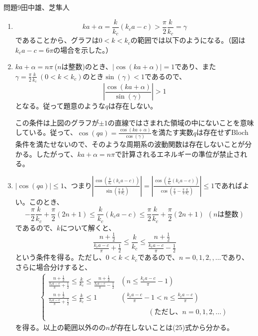 \documentclass[fleqn]{jbook}
\begin{document}
\begin{answer}{問題9}{田中雄、芝隼人}
\begin{enumerate}
\item
\begin{equation}
ka+\alpha = \frac{k}{k_{c}}(k_{c}a-c) > \frac{\pi}{2}\frac{k}{k_{c}} = \gamma
\end{equation}
であることから、グラフは$0<k<k_{c}$の範囲では以下のようになる。（図は$k_ca-c=6\pi$の場合を示した。）
\begin{center}

\end{center}
\item
$ka+\alpha=n\pi \ $($n$は整数)のとき、$|\cos (ka+\alpha )|=1$であり、また$\gamma =\frac{\pi}{2}\frac{k}{k_{c}}\ (0<k<k_{c})$のとき$\sin (\gamma)<1$であるので、
\begin{equation}
\left|\frac{\cos (ka+\alpha )}{\sin (\gamma)}\right|>1
\end{equation}
となる。従って題意のような$q$は存在しない。

この条件は上図のグラフが$\pm 1$の直線ではさまれた領域の中にないことを意味している。従って、$\cos (qa)=\frac{\cos (ka+\alpha )}{\cos (\gamma)}$を満たす実数$q$は存在せずBloch条件を満たせないので、そのような周期系の波動関数は存在しないことが分かる。したがって、$ka+\alpha=n\pi $で計算されるエネルギーの準位が禁止される。\\

\item
$|\cos (qa)|\le 1$、つまり$\displaystyle\left|\frac{\cos (\frac{k}{k_{c}}(k_{c}a-c))}{\sin (\frac{\pi}{2}\frac{k}{k_{c}})}\right|=\left|\frac{\cos (\frac{k}{k_{c}}(k_{c}a-c))}{\cos (\frac{\pi}{2}-\frac{\pi}{2}\frac{k}{k_{c}})}\right|\le 1$であればよい。このとき、
\begin{equation}
-\frac{\pi}{2}\frac{k}{k_{c}}+\frac{\pi}{2}(2n+1) \le \frac{k}{k_{c}}(k_{c}a-c) \le \frac{\pi}{2}\frac{k}{k_{c}}+\frac{\pi}{2}(2n+1) \ \ (nは整数)
\end{equation}
であるので、$k$について解くと、
\begin{equation}
\displaystyle\frac{n+\frac{1}{2}}{\frac{k_{c}a-c}{\pi}+ \frac{1}{2}}\le \frac{k}{k_{c}} \le \frac{n+\frac{1}{2}}{\frac{k_{c}a-c}{\pi}-\frac{1}{2}}
\end{equation}
という条件を得る。ただし、$0<k<k_{c}$であるので、$n=0,1,2,,...$であり、さらに場合分けすると、
\begin{eqnarray}
\left \{
  \begin{array}{ll}{}
\displaystyle    \frac{n+\frac{1}{2}}{\frac{k_{c}a-c}{\pi}+ \frac{1}{2}}\le \frac{k}{k_{c}} \le \frac{n+\frac{1}{2}}{\frac{k_{c}a-c}{\pi}-\frac{1}{2}} & \displaystyle \left(n\le \frac{k_{c}a-c}{\pi}-1 \right)  \\
\displaystyle    \frac{n+\frac{1}{2}}{\frac{k_{c}a-c}{\pi}+ \frac{1}{2}}\le \frac{k}{k_{c}} \le 1 & \displaystyle\left(\frac{k_{c}a-c}{\pi}-1 < n\le \frac{k_{c}a-c}{\pi}\right) \\
    &\qquad\qquad (ただし、n =0,1,2, \ldots)\\
  \end{array}
\right.
\end{eqnarray}
を得る。以上の範囲以外のの$n$が存在しないことは(25)式から分かる。\\


\end{enumerate}
\end{answer}
\end{document}
